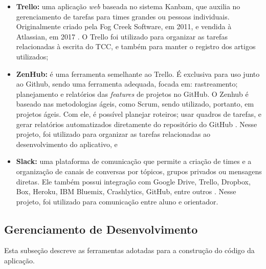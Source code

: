 \begin{itemize}

    \item \textbf{Trello: }uma aplicação \emph{web} baseada no sistema Kanbam, que auxilia no 
	gerenciamento de tarefas para times grandes ou pessoas individuais. 
	Originalmente criado pela Fog Creek Software, em 2011, e vendida à Atlassian, em 
	2017 \cite{trello2011}. O Trello foi utilizado para organizar as tarefas 
	relacionadas à escrita do TCC, e também para manter o registro dos artigos utilizados;
    \item \textbf{ZenHub: }é uma ferramenta semelhante ao Trello. É exclusiva para uso junto ao 
	Github, sendo uma ferramenta adequada, focada em: rastreamento; planejamento e 
	relatórios das \emph{features} de projetos no GitHub. O Zenhub é baseado nas 
	metodologias ágeis, como Scrum, sendo utilizado, portanto, em projetos ágeis. Com ele, 
	é possível planejar roteiros; usar quadros de tarefas, e gerar relatórios 
	automatizados diretamente do repositório do GitHub \cite{zenhub2020}. 
	Nesse projeto, foi utilizado para organizar as tarefas relacionadas ao 
	desenvolvimento do aplicativo, e
    \item \textbf{Slack: }uma plataforma de comunicação que permite a criação de times e a 
	organização de canais de conversas por tópicos, grupos privados ou mensagens 
	diretas. Ele também possui integração com  Google Drive, Trello, Dropbox, Box, 
	Heroku, IBM Bluemix, Crashlytics, GitHub, entre outros \cite{slack2013}. Nesse 
	projeto, foi utilizado para comunicação entre aluno e orientador.

\end{itemize}


\subsection{Gerenciamento de Desenvolvimento}

Esta subseção descreve as ferramentas adotadas para a construção do código da aplicação.


